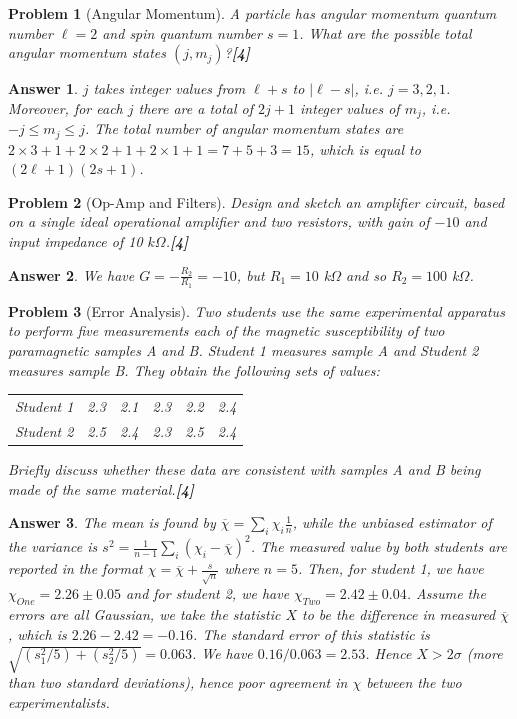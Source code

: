 \documentclass[a4paper]{article}
\newtheorem{ans}{Answer}[subsection]
\theoremstyle{new}
\newtheorem{qns}{Problem}[subsection]
\begin{document}
\begin{qns}[Angular Momentum]
A particle has angular momentum quantum number $\ell =2$ and spin quantum number $s=1$. What are the possible total angular momentum states $(j,m_j)$?\hfill\textbf{[4]}
\end{qns}
\begin{ans}
$j$ takes integer values from $\ell+s$ to $|\ell-s|$, i.e. $j=3,2,1$. Moreover, for each $j$ there are a total of $2j+1$ integer values of $m_j$, i.e. $-j\leq m_j\leq j$. The total number of angular momentum states are $2\times 3+1+2\times 2+1+2\times1+1=7+5+3=15$, which is equal to $(2\ell+1)(2s+1)$.
\end{ans}
\begin{qns}[Op-Amp and Filters]
Design and sketch an amplifier circuit, based on a single ideal operational amplifier and two resistors, with gain of $-10$ and input impedance of 10 $k\Omega$.\hfill\textbf{[4]}
\end{qns}
\begin{ans}
We have $G=-\frac{R_2}{R_1}=-10$, but $R_1=10$ k$\Omega$ and so $R_2=100$ k$\Omega$.
\end{ans}
\begin{qns}[Error Analysis]
Two students use the same experimental apparatus to perform five measurements each of the magnetic susceptibility of two paramagnetic samples A and B. Student 1 measures sample A and Student 2 measures sample B. They obtain the following sets of values:
\begin{center}
\begin{tabular}{ c c c c c c}
Student 1 & 2.3 & 2.1 & 2.3 & 2.2 & 2.4 \\
Student 2 & 2.5 & 2.4 & 2.3 & 2.5 & 2.4  
\end{tabular}
\end{center}
Briefly discuss whether these data are consistent with samples A and B being made of the same material.\hfill\textbf{[4]}
\end{qns}
\begin{ans}
The mean is found by $\overline{\chi}=\sum_i\chi_i\frac{1}{n}$, while the unbiased estimator of the variance is $s^2=\frac{1}{n-1}\sum_i(\chi_i-\overline{\chi})^2$. The measured value by both students are reported in the format $\chi=\overline{\chi}+\frac{s}{\sqrt{n}}$ where $n=5$. Then, for student 1, we have $\chi_{One}=2.26\pm0.05$ and for student 2, we have $\chi_{Two}=2.42\pm0.04$. Assume the errors are all Gaussian, we take the statistic $X$ to be the difference in measured $\overline{\chi}$, which is $2.26-2.42=-0.16$. The standard error of this statistic is $\sqrt{(s_1^2/5)+(s_2^2/5)}=0.063$. We have $0.16/0.063=2.53$. Hence $X>2\sigma$ (more than two standard deviations), hence poor agreement in $\chi$ between the two experimentalists. 
\end{ans}
\newpage
\end{document}
